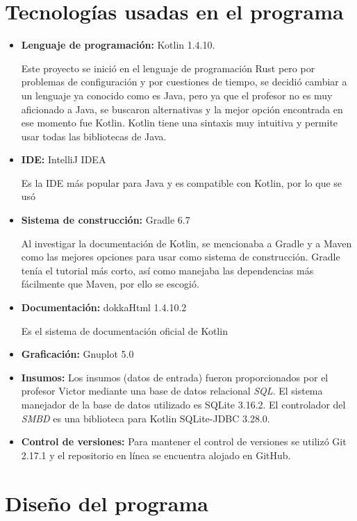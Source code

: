 \documentclass{article}
\begin{document}
\section{Tecnologías usadas en el programa}
\begin{itemize}
	\item{ \textbf{Lenguaje de programación:} Kotlin 1.4.10. 
		
	Este proyecto se inició en el lenguaje de programación Rust pero por problemas de configuración y por cuestiones de tiempo, se decidió cambiar a un lenguaje ya conocido como es Java, pero ya que el profesor no es muy aficionado a Java, se buscaron alternativas y la mejor opción encontrada en ese momento fue Kotlin. Kotlin tiene una sintaxis muy intuitiva y permite usar todas las bibliotecas de Java.}
	\item {\textbf{IDE:} IntelliJ IDEA
		
	Es la IDE más popular para Java y es compatible con Kotlin, por lo que se usó}
	\item {\textbf{Sistema de construcción:} Gradle 6.7
		
	Al investigar la documentación de Kotlin, se mencionaba a Gradle y a Maven como las mejores opciones para usar como sistema de construcción. Gradle tenía el tutorial más corto, así como manejaba las dependencias más fácilmente que Maven, por ello se escogió.
	}
	\item {\textbf{Documentación:} dokkaHtml 1.4.10.2  
	
	Es el sistema de documentación oficial de Kotlin}
	\item {\textbf{Graficación:} Gnuplot 5.0}
	\item {\textbf{Insumos:} Los insumos (datos de entrada) fueron proporcionados por el profesor Victor mediante una base de datos relacional \textit{SQL}. El sistema manejador de la base de datos utilizado es SQLite 3.16.2. El controlador del \textit{SMBD} es una biblioteca para Kotlin SQLite-JDBC 3.28.0.}
	\item {\textbf{Control de versiones:} Para mantener el control de versiones se utilizó Git 2.17.1 y el repositorio en línea se encuentra alojado en GitHub.}
\end{itemize}

\section{Diseño del programa}
\end{document}
